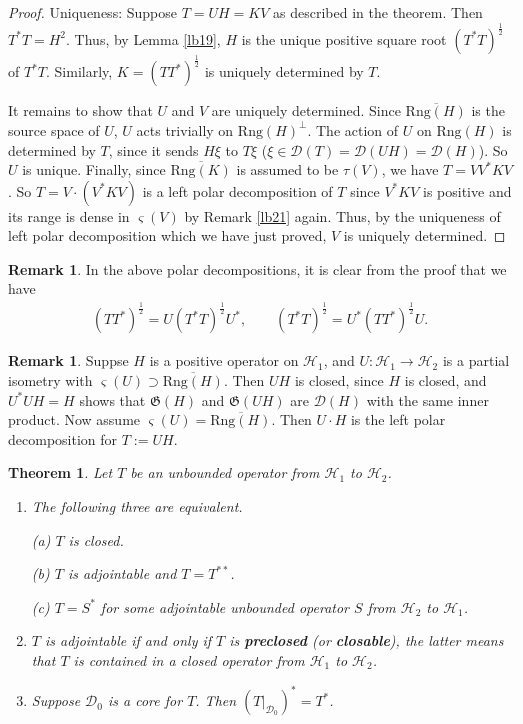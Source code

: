 \documentclass[12pt,a4paper,notitlepage]{article}
\theoremstyle{definition}
\newtheorem{rem}[df]{Remark}
\theoremstyle{plain}
\newtheorem{thm}[df]{Theorem}
\newcommand{\fk}{\mathfrak}
\newcommand{\mc}{\mathcal}
\newcommand{\ovl}{\overline}
\newcommand{\Dom}{\scr D}
\newcommand{\scr}{\mathscr}
\newcommand{\sgm}{\varsigma}
\newcommand{\Rng}{\mathrm{Rng}}
\numberwithin{equation}{section}
\begin{document}
\begin{proof}
 
	
Uniqueness: Suppose $T=UH=KV$ as described in the theorem. Then $T^*T=H^2$. Thus, by Lemma \ref{lb19}, $H$ is the unique positive square root $(T^*T)^{\frac 12}$ of $T^*T$. Similarly, $K=(TT^*)^{\frac 12}$ is uniquely determined by $T$.

It remains to show that $U$ and $V$ are uniquely determined. Since $\ovl{\Rng(H)}$ is the source space of $U$, $U$ acts trivially on $\Rng(H)^\perp$. The action of $U$ on $\Rng(H)$ is determined by $T$, since it sends $H\xi$ to $T\xi$ ($\xi\in\Dom(T)=\Dom(UH)=\Dom(H)$). So $U$ is unique. Finally, since $\ovl{\Rng(K)}$ is assumed to be $\tau(V)$, we have $T=VV^*KV$. So $T=V\cdot (V^*KV)$ is a left polar decomposition of $T$ since $V^*KV$ is positive and its range is dense in $\sgm(V)$ by Remark \ref{lb21} again. Thus, by the uniqueness of left polar decomposition which we have just proved, $V$ is uniquely determined.
\end{proof}


\begin{rem}\label{lb32}
In the above polar decompositions, it is clear from the proof that we have
\begin{align*}
(TT^*)^{\frac 12}=U(T^*T)^{\frac 12}U^*,\qquad (T^*T)^{\frac 12}=U^*(TT^*)^{\frac 12}U.	
\end{align*}
\end{rem}




\begin{rem}\label{lb45}
Suppse $H$ is a positive operator on $\mc H_1$, and $U:\mc H_1\rightarrow\mc H_2$ is a partial isometry with $\sgm(U)\supset \ovl{\Rng(H)}$. Then $UH$ is closed, since $H$ is closed, and  $U^*UH=H$ shows that $\fk G(H)$ and $\fk G(UH)$ are $\Dom(H)$ with the same inner product. Now assume $\sgm(U)=\ovl{\Rng(H)}$. Then  $U\cdot H$ is the left polar decomposition for $T:=UH$.
\end{rem}



\begin{thm}\label{lb24}
Let $T$ be an unbounded operator from $\mc H_1$ to $\mc H_2$.
\begin{enumerate}
\item The following three are equivalent.

(a) $T$ is closed.

(b) $T$ is adjointable and $T=T^{**}$.

(c) $T=S^*$ for some adjointable unbounded operator $S$ from $\mc H_2$ to $\mc H_1$.

\item $T$ is adjointable if and only if $T$ is \textbf{preclosed} (or \textbf{closable}), the latter means that $T$ is contained in a closed operator from $\mc H_1$ to $\mc H_2$.

\item Suppose $\Dom_0$ is a core for $T$. Then $(T|_{\Dom_0})^*=T^*$.


\end{enumerate}
\end{thm}
\end{document}
